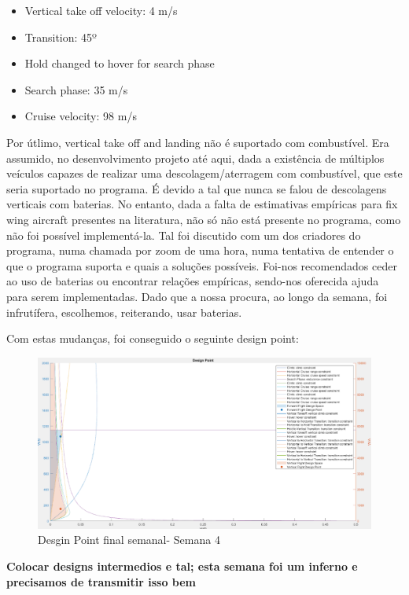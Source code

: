 \begin{itemize}
    \item Vertical take off velocity: 4 m/s
    \item Transition: 45º
    \item Hold changed to hover for search phase
    \item Search phase: 35 m/s
    \item Cruise velocity: 98 m/s
\end{itemize}
Por útlimo, vertical take off and landing não é suportado com combustível. Era assumido, no desenvolvimento projeto até aqui, dada a existência de múltiplos veículos capazes de realizar uma descolagem/aterragem com combustível, que este seria suportado no programa. É devido a tal que nunca se falou de descolagens verticais com baterias. No entanto, dada a falta de estimativas empíricas para fix wing aircraft presentes na literatura, não só não está presente no programa, como não foi possível implementá-la. Tal foi discutido com um dos criadores do programa, numa chamada por zoom de uma hora, numa tentativa de entender o que o programa suporta e quais a soluções possíveis. Foi-nos recomendados ceder ao uso de baterias ou encontrar relações empíricas, sendo-nos oferecida ajuda para serem implementadas. Dado que a nossa procura, ao longo da semana, foi infrutífera, escolhemos, reiterando, usar baterias.\par
Com estas mudanças, foi conseguido o seguinte design point:
\FloatBarrier
\begin{figure}[h]
    \centering
    \includegraphics[width=\textwidth]{Imagens/semana4 powerpoint designpoint.png}
    \caption{Desgin Point final semanal- Semana 4}
    \label{designescolhido}
\end{figure}
\FloatBarrier
{\large\textbf{Colocar designs intermedios e tal; esta semana foi um inferno e precisamos de transmitir isso bem}}